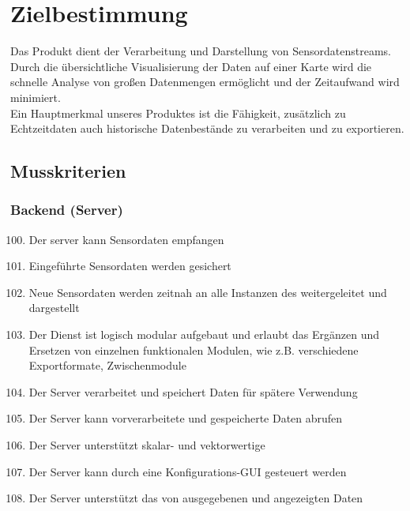 \chapter{Zielbestimmung}
Das Produkt dient der Verarbeitung und Darstellung von Sensordatenstreams. Durch die übersichtliche Visualisierung der Daten auf einer Karte wird die schnelle Analyse von großen Datenmengen ermöglicht und der Zeitaufwand wird minimiert.\\
Ein Hauptmerkmal unseres Produktes ist die Fähigkeit, zusätzlich zu Echtzeitdaten auch historische Datenbestände zu verarbeiten und zu exportieren.
\section{Musskriterien}
\subsection{Backend (Server)}
\begin{enumerate}[label=\textbf{MK\arabic{enumi}0}]
	\setcounter{enumi}{99}
	\item Der \gls{server} kann Sensordaten empfangen
	\item Eingeführte Sensordaten werden gesichert
	\item Neue Sensordaten werden zeitnah an alle Instanzen des  weitergeleitet und dargestellt
	\item Der Dienst ist logisch modular aufgebaut und erlaubt das Ergänzen und Ersetzen von einzelnen funktionalen Modulen, wie z.B. verschiedene Exportformate, Zwischenmodule
	\item Der Server verarbeitet und speichert Daten für spätere Verwendung
	\item Der Server kann vorverarbeitete und gespeicherte Daten abrufen
	\item Der Server unterstützt skalar- und vektorwertige 
	\item Der Server kann durch eine Konfigurations-GUI gesteuert werden
	\item Der Server unterstützt das  von ausgegebenen und angezeigten Daten
\end{enumerate}
